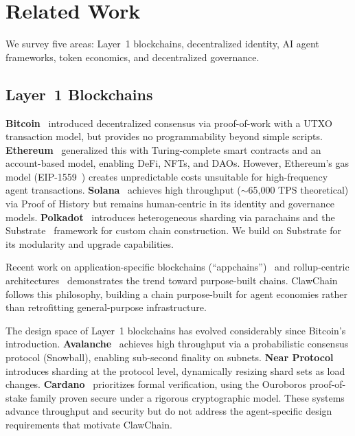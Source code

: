 \documentclass[conference]{IEEEtran}
\begin{document}

\section{Related Work}\label{sec:related}

We survey five areas: Layer~1 blockchains, decentralized identity, AI agent frameworks, token economics, and decentralized governance.

\subsection{Layer~1 Blockchains}

\textbf{Bitcoin}~\cite{nakamoto2008bitcoin} introduced decentralized consensus via proof-of-work with a UTXO transaction model, but provides no programmability beyond simple scripts. \textbf{Ethereum}~\cite{buterin2014ethereum} generalized this with Turing-complete smart contracts and an account-based model, enabling DeFi, NFTs, and DAOs. However, Ethereum's gas model (EIP-1559~\cite{roughgarden2021eip1559}) creates unpredictable costs unsuitable for high-frequency agent transactions. \textbf{Solana}~\cite{yakovenko2018solana} achieves high throughput ($\sim$65,000 TPS theoretical) via Proof of History but remains human-centric in its identity and governance models. \textbf{Polkadot}~\cite{wood2016polkadot} introduces heterogeneous sharding via parachains and the Substrate~\cite{parity_substrate} framework for custom chain construction. We build on Substrate for its modularity and upgrade capabilities.

Recent work on application-specific blockchains (``appchains'')~\cite{cosmos_sdk} and rollup-centric architectures~\cite{thibault2022rollups} demonstrates the trend toward purpose-built chains. ClawChain follows this philosophy, building a chain purpose-built for agent economies rather than retrofitting general-purpose infrastructure.

The design space of Layer~1 blockchains has evolved considerably since Bitcoin's introduction. \textbf{Avalanche}~\cite{rocket2019avalanche} achieves high throughput via a probabilistic consensus protocol (Snowball), enabling sub-second finality on subnets. \textbf{Near Protocol}~\cite{skidanov2019near} introduces sharding at the protocol level, dynamically resizing shard sets as load changes. \textbf{Cardano}~\cite{kiayias2017ouroboros} prioritizes formal verification, using the Ouroboros proof-of-stake family proven secure under a rigorous cryptographic model. These systems advance throughput and security but do not address the agent-specific design requirements that motivate ClawChain.
\end{document}
